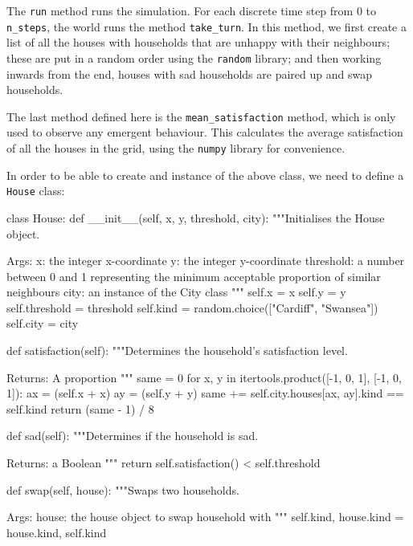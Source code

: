 The \texttt{run} method runs the simulation. For each discrete time
step from 0 to \texttt{n_steps}, the world runs the method
\texttt{take_turn}.
In this method, we first create a list of all the houses with households that
are unhappy with their neighbours; these are put in a random order using the
\texttt{random} library; and then working inwards from the end,
houses with sad households are paired up and swap households.

The last method defined here is the \texttt{mean_satisfaction}
method, which is only used to observe any emergent behaviour.
This calculates the average satisfaction of all the houses in the grid, using
the \texttt{numpy} library for convenience.

In order to be able to create and instance of the above class, we need to define
a \texttt{House} class:

\begin{pyin}
class House:
    def __init__(self, x, y, threshold, city):
        """Initialises the House object.

        Args:
            x: the integer x-coordinate
            y: the integer y-coordinate
            threshold: a number between 0 and 1 representing
              the minimum acceptable proportion of similar
              neighbours
            city: an instance of the City class
        """
        self.x = x
        self.y = y
        self.threshold = threshold
        self.kind = random.choice(["Cardiff", "Swansea"])
        self.city = city

    def satisfaction(self):
        """Determines the household's satisfaction level.

        Returns:
            A proportion
        """
        same = 0
        for x, y in itertools.product([-1, 0, 1], [-1, 0, 1]):
            ax = (self.x + x) %
            ay = (self.y + y) %
            same += self.city.houses[ax, ay].kind == self.kind
        return (same - 1) / 8

    def sad(self):
        """Determines if the household is sad.

        Returns:
            a Boolean
        """
        return self.satisfaction() < self.threshold

    def swap(self, house):
        """Swaps two households.

        Args:
            house: the house object to swap household with
        """
        self.kind, house.kind = house.kind, self.kind
\end{pyin}

